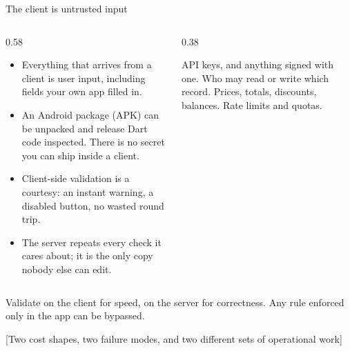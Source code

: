 \documentclass[10pt,aspectratio=169,t]{beamer}
\begin{document}
\begin{frame}[eyebrow=Server and client]{The client is untrusted input}
  \begin{columns}[T]
    \begin{column}{0.58\textwidth}
      \begin{itemize}
        \item Everything that arrives from a client is user input, including fields your own app filled in.
        \item An Android package (APK) can be unpacked and release Dart code inspected. There is no secret you can ship inside a client.
        \item Client-side validation is a courtesy: an instant warning, a disabled button, no wasted round trip.
        \item The server repeats every check it cares about; it is the only copy nobody else can edit.
      \end{itemize}
    \end{column}
    \begin{column}{0.38\textwidth}
      \begin{hint}
        API keys, and anything signed with one. Who may read or write which record. Prices, totals, discounts, balances. Rate limits and quotas.
      \end{hint}
    \end{column}
  \end{columns}
  \begin{takeaway}{Validate on the client for speed, on the server for correctness.}
    Any rule enforced only in the app can be bypassed.
  \end{takeaway}
\end{frame}

[Two cost shapes, two failure modes, and two different sets of operational work]
\end{document}
